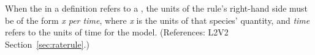 When the  in a \RateRule definition refers to a \Species,
the units of the rule's right-hand side must be of the form \emph{x per
time}, where \emph{x} is the units of that species' quantity, and
\emph{time} refers to the units of time for the model.  (References: L2V2
Section~\ref{sec:raterule}.)
